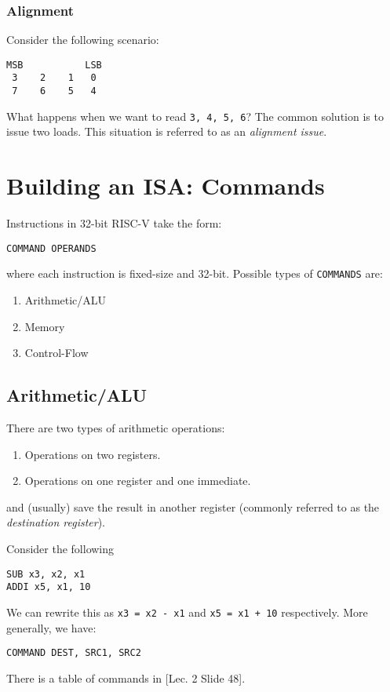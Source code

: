 \documentclass{report}
\newcommand{\example}[2]{\begin{tcolorbox}[colback=blue!5!white,colframe=black!75!blue,title={Example:
      #1}]{#2}\end{tcolorbox}}
\begin{document}
\subsubsection{Alignment}
Consider the following scenario:
\begin{verbatim}
MSB           LSB
 3    2    1   0
 7    6    5   4
\end{verbatim}
What happens when we want to read \texttt{3, 4, 5, 6}? The common solution is to issue two
loads. This situation is referred to as an \textit{alignment issue}.





\section{Building an ISA: Commands}
Instructions in 32-bit RISC-V take the form:
\begin{center}
  \texttt{COMMAND OPERANDS}
\end{center}
where each instruction is fixed-size and 32-bit. Possible types of \texttt{COMMANDS} are:

\begin{enumerate}[label=\textit{(\roman*)}]
\item Arithmetic/ALU
\item Memory
\item Control-Flow
\end{enumerate}


\subsection{Arithmetic/ALU}
There are two types of arithmetic operations:
\begin{enumerate}[label=\textit{(\roman*)}]
\item Operations on two registers.
\item Operations on one register and one immediate.
\end{enumerate}
and (usually) save the result in another register (commonly referred to as the \textit{destination
  register}). 

\example{Source and Destination Registers}{
  Consider the following
  \begin{center}
    \texttt{SUB x3, x2, x1} \\
    \texttt{ADDI x5, x1, 10}
  \end{center}
  We can rewrite this as \texttt{x3 = x2 - x1} and \texttt{x5 = x1 + 10} respectively. More
  generally, we have:
  \begin{center}
    \texttt{COMMAND DEST, SRC1, SRC2}
  \end{center}
}
There is a table of commands in [Lec. 2 Slide 48].
\end{document}
